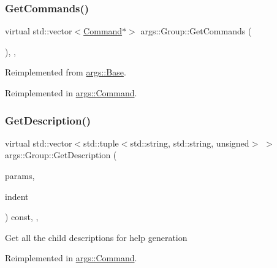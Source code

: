 \subsubsection{\texorpdfstring{Get\+Commands()}{GetCommands()}}
{\footnotesize\ttfamily virtual std\+::vector$<$\hyperlink{classargs_1_1_command}{Command}$\ast$$>$ args\+::\+Group\+::\+Get\+Commands (\begin{DoxyParamCaption}{ }\end{DoxyParamCaption})\hspace{0.3cm}{\ttfamily [inline]}, {\ttfamily [override]}, {\ttfamily [virtual]}}



Reimplemented from \hyperlink{classargs_1_1_base_a8b41df1247be5545f95279608d835bf2}{args\+::\+Base}.



Reimplemented in \hyperlink{classargs_1_1_command_a59511be164aa3a0cc5fbbfb75ca79fec}{args\+::\+Command}.

\mbox{\label{classargs_1_1_group_a57068f355d7d62316b41f7a8e2528495}} 
\subsubsection{\texorpdfstring{Get\+Description()}{GetDescription()}}
{\footnotesize\ttfamily virtual std\+::vector$<$std\+::tuple$<$std\+::string, std\+::string, unsigned$>$ $>$ args\+::\+Group\+::\+Get\+Description (\begin{DoxyParamCaption}\item[{const \hyperlink{structargs_1_1_help_params}{Help\+Params} \&}]{params,  }\item[{const unsigned int}]{indent }\end{DoxyParamCaption}) const\hspace{0.3cm}{\ttfamily [inline]}, {\ttfamily [override]}, {\ttfamily [virtual]}}

Get all the child descriptions for help generation 

Reimplemented in \hyperlink{classargs_1_1_command_afdd0a3ea344a4a5672565d1f2f0157f1}{args\+::\+Command}.

\mbox{\label{classargs_1_1_group_ae0fa8f5ae77fda45086e7815617ddff7}} 
